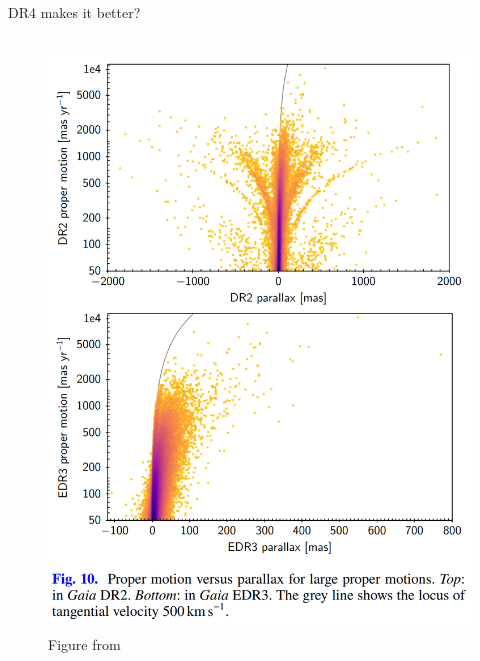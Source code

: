 \documentclass[hyperref={colorlinks = true, linkcolor=blue},8pt]{beamer}
\begin{document}
\begin{frame}{DR4 makes it better?}
\begin{columns}
\begin{column}{0.5\columnwidth}
\begin{figure}
			\includegraphics[width=\columnwidth]{parallaxvspropermotiondr2edr3.png}
			\caption{Figure from \cite{fabriciusGaia2021}}
		\end{figure}
\end{column}
\end{columns}
\end{frame}
\end{document}
